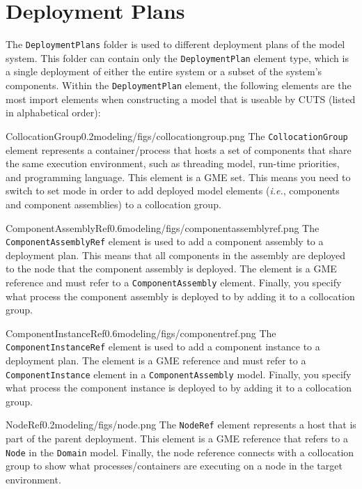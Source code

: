 \section{Deployment Plans}

The \texttt{DeploymentPlans} folder is used to different
deployment plans of the model system. This folder can contain 
only the \texttt{DeploymentPlan} element
type, which is a single deployment of either the entire system or
a subset of the system's components. Within the \texttt{DeploymentPlan} 
element, the  following elements are the most import elements when 
constructing a model that is useable by CUTS (listed in alphabetical order):

\begin{modelelement}{CollocationGroup}{0.2}{modeling/figs/collocationgroup.png}
The \texttt{CollocationGroup} element represents a container/\-process 
that hosts a set of components that share the same execution environment,
such as threading model, run-time priorities, and programming language.
This element is a GME set. This means you need to switch to set mode
in order to add deployed model elements (\textit{i.e.}, components
and component assemblies) to a collocation group.
\end{modelelement}

\begin{modelelement}{ComponentAssemblyRef}{0.6}{modeling/figs/componentassemblyref.png}
The \texttt{ComponentAssemblyRef} element is used to add a component
assembly to a deployment plan. This means that all components in the 
assembly are deployed to the node that the component assembly is deployed. 
The element is a GME reference and must refer to a \texttt{ComponentAssembly} 
element.  Finally, you specify what process the component assembly
is deployed to by adding it to a collocation group.
\end{modelelement}

\begin{modelelement}{ComponentInstanceRef}{0.6}{modeling/figs/componentref.png}
The \texttt{ComponentInstanceRef} element is used to add a component
instance to a deployment plan. The element is a GME reference and 
must refer to a \texttt{ComponentInstance} element in a 
\texttt{ComponentAssembly} model. Finally, you specify what process
the component instance is deployed to by adding it to a collocation 
group.
\end{modelelement}

\begin{modelelement}{NodeRef}{0.2}{modeling/figs/node.png}
The \texttt{NodeRef} element represents a host that is part of the
parent deployment. This element is a GME reference that refers to
a \texttt{Node} in the \texttt{Domain} model. Finally, the 
node reference connects with a collocation group to show what
processes/containers are executing on a node in the target
environment.
\end{modelelement}

